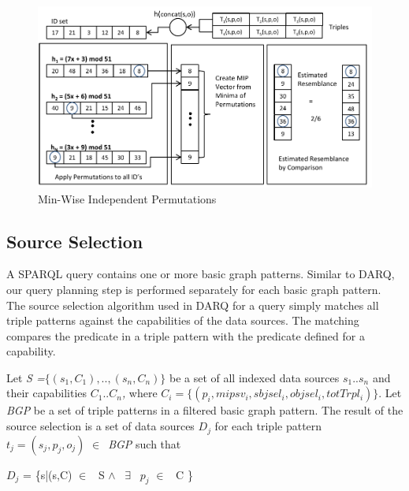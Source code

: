 \documentclass{sig-alternate}  %
\begin{document}
\begin{figure}
\begin{centering}
\includegraphics[scale=0.53]{img/mips} 
\par\end{centering}

\caption{Min-Wise Independent Permutations}
\end{figure}

\subsection{Source Selection}
A SPARQL query contains one or more basic graph patterns. Similar to DARQ, our query planning
step is performed separately for each basic graph pattern.
The source selection algorithm used in DARQ for
a query simply matches all triple patterns against the capabilities
of the data sources. The matching compares the predicate in a triple
pattern with the predicate defined for a capability. 

Let \emph{S =$\{(s_1,C_1),..,(s_n,C_n)\}$ } be a set of all indexed data sources \emph{$s_1..s_n$} and their capabilities \emph{$C_1..C_n$,} where \emph{$C_i = \{(p_i, mipsv_i, sbjsel_i, objsel_i, totTrpl_i)\}$}.
Let \emph{BGP} be a set of triple
patterns in a filtered basic graph pattern. The result of the source
selection is a set of data sources $D_j$ for each triple
pattern $t_j = (s_j, p_j, o_j)$ $\in$\ \emph{BGP} such that 

\begin{center}
$D_j$ = \{s|(s,C) $\in$ \ S $\wedge$ \ $\exists$
\ $p_j$ $\in$ \ C \}
\par\end{center}
\end{document}
